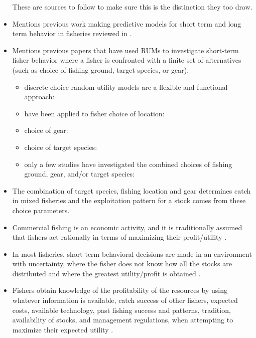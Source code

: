 \documentclass[a4paper,10pt]{report}
\begin{document}
\begin{itemize}
These are sources to follow to make sure this is the distinction they too draw.
\item Mentions previous work making predictive models for  short term and long term behavior in fisheries reviewed in \cite{SalasGaertner:2004, Branchetal:2006, Hilborn:2007}. 
\item Mentions previous papers that have used RUMs to investigate short-term fisher behavior where a fisher is confronted with a finite set of alternatives (such as choice of fishing ground, target species, or gear). 
\begin{itemize}
\item discrete choice random utility models are a flexible and functional approach: \cite{Wilenetal:2002}
\item have been applied to fisher choice of location: \cite{Wilenetal:2002,CampbellHand:1999,Huttonetal:2004}
\item choice of gear: \cite{BockstaelOpaluch:1983,EggertTveteras:2004}
\item choice of target species: \cite{PradhanLeung:2004, CurtisMcConnell:2004, Vermardetal:2008}
\item only a few studies have investigated the combined choices of fishing ground, gear, and/or target species: \cite{HollandSutinen:2000,Marchaletal:2009}
\end{itemize}
\item The combination of target species, fishing location and gear determines catch in mixed fisheries and the exploitation pattern for a stock comes from these choice parameters. 
\item Commercial fishing is an economic activity, and it is traditionally assumed that fishers act rationally in terms of maximizing their profit/utility \citep{vanPuttenetal:2011}. 
\item In most fisheries, short-term behavioral decisions are made in an environment with uncertainty, where the fisher does not know how all the stocks are distributed and where the greatest utility/profit is obtained \citep{MangelClark:1983}. 
\item Fishers obtain knowledge of the profitability of the resources by using whatever information is available, catch success of other fishers, expected costs, available technology, past fishing success and patterns, tradition, availability of stocks, and management regulations, when attempting to maximize their expected utility \citep{HilbornWalters:1992, SalasGaertner:2004}. 

\end{itemize}
\end{document}
